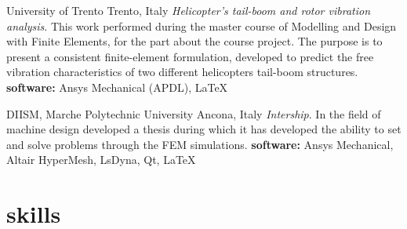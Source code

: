 \documentclass[a4,oneside]{friggeri-cv} %
\begin{document}
\begin{entrylist}     
    {University of Trento}
    {Trento, Italy}
    {\emph{Helicopter's tail-boom and rotor vibration analysis}.}
    {This work performed during the master course of Modelling and Design with
Finite Elements, for the part about the course project. The purpose is to
present a consistent finite-element formulation, developed to predict the free
vibration characteristics of two different helicopters tail-boom structures.}
    {\textbf{software: } Ansys Mechanical (APDL), \LaTeX}
    {\href{https://github.com/frank1789/FEM-Analysis---Helicopter-s-Tail}{\faGithub}}
      
      
    {DIISM, Marche Polytechnic University}
    {Ancona, Italy}
    {\emph{Intership}.}
    {In the field of machine design developed a thesis during which it has
    developed the ability to set and solve problems through the FEM
    simulations.}
    {\textbf{software: } Ansys Mechanical, Altair  HyperMesh, LsDyna, Qt, \LaTeX}
    {\href{https://github.com/frank1789/LsDynaToAPDL}{\faGithub}}
      
    
  \end{entrylist}

\section{skills}
	\begin{entrylist} 
		
		\\
		
		
		\\
		
	\end{entrylist}
\end{document}
